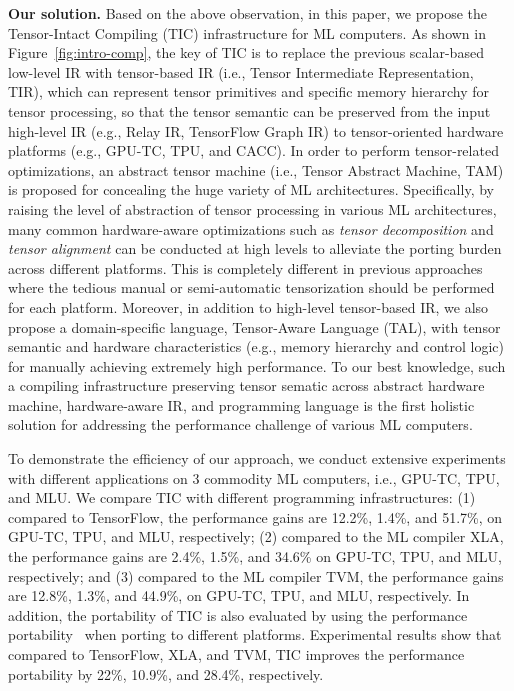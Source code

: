 \documentclass[pageno]{jpaper}
\begin{document}
\textbf{Our solution.} Based on the above observation, in this paper, we propose the Tensor-Intact Compiling (TIC) infrastructure for ML computers. As shown in Figure~\ref{fig:intro-comp}, the key of TIC is to replace the previous scalar-based low-level IR with tensor-based IR (i.e., Tensor Intermediate Representation, TIR), which can represent tensor primitives and specific memory hierarchy for tensor processing, so that the tensor semantic can be preserved from the input high-level IR (e.g., Relay IR, TensorFlow Graph IR) to tensor-oriented hardware platforms (e.g., GPU-TC, TPU, and CACC). In order to perform tensor-related optimizations, an abstract tensor machine (i.e., Tensor Abstract Machine, TAM) is proposed for concealing the huge variety of ML architectures. Specifically, by raising the level of abstraction of tensor processing in various ML architectures, many common hardware-aware optimizations such as \emph{tensor decomposition} and \emph{tensor alignment} can be conducted at high levels to alleviate the porting burden across different platforms. This is completely different in previous approaches where the tedious manual or semi-automatic tensorization should be performed for each platform. Moreover, in addition to high-level tensor-based IR, we also propose a domain-specific language, Tensor-Aware Language (TAL), with tensor semantic and hardware characteristics (e.g., memory hierarchy and control logic) for manually achieving extremely high performance. To our best knowledge, such a compiling infrastructure preserving tensor sematic across abstract hardware machine, hardware-aware IR, and programming language is the first holistic solution for addressing the performance challenge of various ML computers.


To demonstrate the efficiency of our approach, we conduct extensive experiments with different applications on $3$ commodity ML computers, i.e., GPU-TC, TPU, and MLU. We compare TIC with different programming infrastructures: %
(1) compared to TensorFlow, the performance gains are 12.2\%, 1.4\%, and 51.7\%, on GPU-TC, TPU, and MLU, respectively; (2) compared to the ML compiler XLA, the performance gains are 2.4\%, 1.5\%, and 34.6\% on GPU-TC, TPU, and MLU, respectively; and (3) compared to the ML compiler TVM, the performance gains are 12.8\%, 1.3\%, and 44.9\%, on GPU-TC, TPU, and MLU, respectively. In addition, the portability of TIC is also evaluated by using the performance portability~\cite{pennycook2019implications} when porting to different platforms. Experimental results show that compared to TensorFlow, XLA, and TVM, TIC improves the performance portability by 22\%, 10.9\%, and 28.4\%, respectively.%
\end{document}
